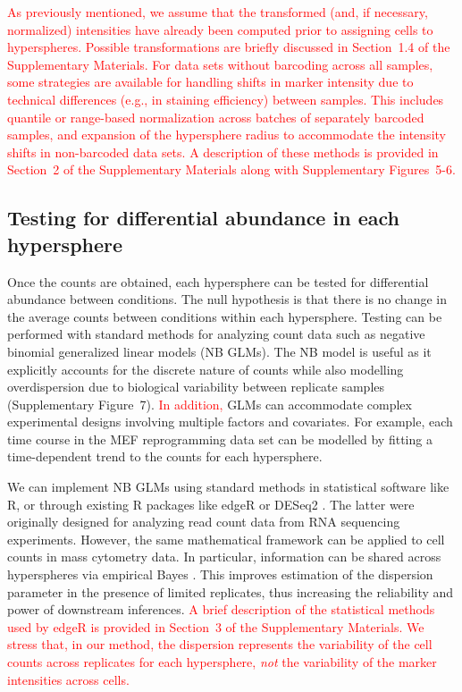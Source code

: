\documentclass{article}
\newcommand\revised[1]{\textcolor{red}{#1}}
\newcommand{\supptransform}{1.4}
\newcommand{\suppintnorm}{2}
\newcommand{\suppedgeR}{3}
\newcommand{\suppfigintnorm}{5-6}
\newcommand{\suppfignbdisp}{7}
\begin{document}
\revised{As previously mentioned, we assume that the transformed (and, if necessary, normalized) intensities have already been computed prior to assigning cells to hyperspheres.
Possible transformations are briefly discussed in Section~\supptransform{} of the Supplementary Materials.
For data sets without barcoding across all samples, some strategies are available for handling shifts in marker intensity due to technical differences (e.g., in staining efficiency) between samples.
This includes quantile or range-based normalization across batches of separately barcoded samples, and expansion of the hypersphere radius to accommodate the intensity shifts in non-barcoded data sets. 
A description of these methods is provided in Section~\suppintnorm{} of the Supplementary Materials along with Supplementary Figures~\suppfigintnorm{}.}    

\subsection{Testing for differential abundance in each hypersphere}
Once the counts are obtained, each hypersphere can be tested for differential abundance between conditions.
The null hypothesis is that there is no change in the average counts between conditions within each hypersphere.
Testing can be performed with standard methods for analyzing count data such as negative binomial generalized linear models (NB GLMs).
The NB model is useful as it explicitly accounts for the discrete nature of counts while also modelling overdispersion due to biological variability between replicate samples (Supplementary Figure~\suppfignbdisp{}).
\revised{In addition,} GLMs can accommodate complex experimental designs involving multiple factors and covariates.
For example, each time course in the MEF reprogramming data set can be modelled by fitting a time-dependent trend to the counts for each hypersphere.

We can implement NB GLMs using standard methods in statistical software like R, or through existing R packages like edgeR \cite{robinson2010edgeR} or DESeq2 \cite{love2014moderated}.
The latter were originally designed for analyzing read count data from RNA sequencing experiments.
However, the same mathematical framework can be applied to cell counts in mass cytometry data.
In particular, information can be shared across hyperspheres via empirical Bayes \cite{mccarthy2012differential, lund2012detecting}.
This improves estimation of the dispersion parameter in the presence of limited replicates, thus increasing the reliability and power of downstream inferences.
\revised{A brief description of the statistical methods used by edgeR is provided in Section~\suppedgeR{} of the Supplementary Materials.
    We stress that, in our method, the dispersion represents the variability of the cell counts across replicates for each hypersphere, \textit{not} the variability of the marker intensities across cells.}
\end{document}

